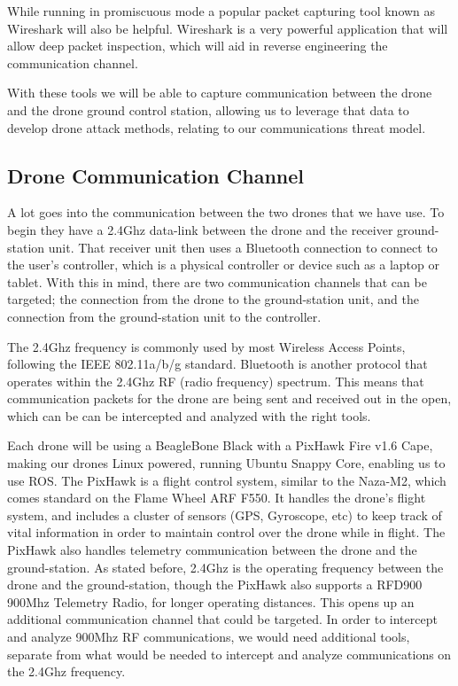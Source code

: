 \documentclass[IEEEtran,letterpaper,10pt,notitlepage,draftclsnofoot,onecolumn]{article}
\begin{document}
While running in promiscuous mode a popular packet capturing tool known as Wireshark will also be helpful. Wireshark
is a very powerful application that will allow deep packet inspection, which will aid in reverse engineering the
communication channel\cite{WiFiPerc}.

With these tools we will be able to capture communication between the drone and the drone ground control station, allowing
us to leverage that data to develop drone attack methods, relating to our communications threat model.


\subsection{Drone Communication Channel}
A lot goes into the communication between the two drones that we have use.
To begin they have a 2.4Ghz data-link between the drone and the receiver ground-station unit.
That receiver unit then uses a Bluetooth connection to connect to the user's controller, which is a physical controller
or device such as a laptop or tablet.\cite{NazaM2} With this in mind, there are two communication channels that can be
targeted; the connection from the drone to the ground-station unit, and the connection from the ground-station unit
to the controller\cite{NazaM2}.

The 2.4Ghz frequency is commonly used by most Wireless Access Points, following the IEEE 802.11a/b/g
standard. Bluetooth is another protocol that operates within the 2.4Ghz RF (radio frequency)
spectrum\cite{HakDaSpectrum}. This means that communication packets for the drone are being sent and received out in the
open, which can be can be intercepted and analyzed with the right tools.

Each drone will be using a BeagleBone Black with a PixHawk Fire v1.6 Cape, making our drones Linux powered, running
Ubuntu Snappy Core, enabling us to use ROS\cite{PixHawk}. The PixHawk is a flight control system, similar to the
Naza-M2, which comes standard on the Flame Wheel ARF F550. It handles the drone's flight system, and includes a cluster
of sensors (GPS, Gyroscope, etc) to keep track of vital information in order to maintain control over the drone while
in flight. The PixHawk also handles telemetry communication between the drone and the ground-station. As stated before,
2.4Ghz is the operating frequency between the drone and the ground-station, though the PixHawk also supports a RFD900
900Mhz Telemetry Radio, for longer operating distances\cite{PixHawkDocs}. This opens up an additional communication
channel that could be targeted. In order to intercept and analyze 900Mhz RF communications, we would need additional
tools, separate from what would be needed to intercept and analyze communications on the 2.4Ghz
frequency\cite{HakDaSpectrum900}.
\end{document}
